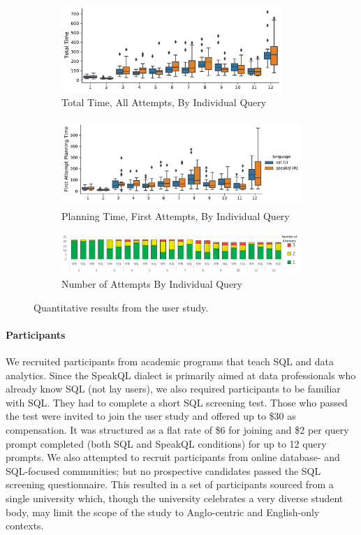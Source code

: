 \begin{figure}[t]
  \centering
  \begin{subfigure}{.5\textwidth}
    \centering
    \includegraphics[height=1.3in]{figures/query-total-time-boxplot.pdf}
    \caption{Total Time, All Attempts, By Individual Query}
    \label{fig:querytotaltime}
  \end{subfigure}%
  \begin{subfigure}{.5\textwidth}
    \centering
    \includegraphics[height=1.3in]{figures/query-planning-time-boxplot.pdf}
    \caption{Planning Time, First Attempts, By Individual Query}
    \label{fig:queryplanningtime}
  \end{subfigure}
  \begin{subfigure}{\textwidth}
    \centering
    \includegraphics[width=\textwidth]{figures/query-attemptnum-histplot-excel.png}
    \caption{Number of Attempts By Individual Query}
    \label{fig:queryattemptnum}
  \end{subfigure}
  \caption{Quantitative results from the user study.}
  \label{fig:quant}
\end{figure}

\paragraph{\textbf{Participants}}
We recruited participants from academic programs that teach SQL and data analytics.  
Since the SpeakQL dialect is primarily aimed at data professionals who already know SQL (not lay users), we also required participants to be familiar with SQL. They had to complete a short SQL screening test. 
Those who passed the test were invited to join the user study and offered up to \$30 as compensation. 
It was structured as a flat rate of \$6 for joining and \$2 per query prompt completed (both SQL and SpeakQL conditions) for up to 12 query prompts. 
We also attempted to recruit participants from online database- and SQL-focused communities; but no prospective candidates passed the SQL screening questionnaire. This resulted in a set of participants sourced from a single university which, though the university celebrates a very diverse student body, may limit the scope of the study to Anglo-centric and English-only contexts.

